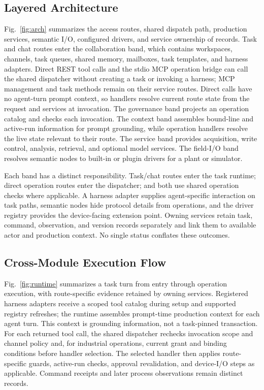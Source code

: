 \subsection{Layered Architecture}
\label{sec:layers}
\label{sec:arch}
Fig.~\ref{fig:arch} summarizes the access routes, shared dispatch path,
production services, semantic I/O, configured drivers, and service ownership
of records. Task and chat routes enter the
collaboration band, which contains workspaces, channels, task queues, shared
memory, mailboxes, task templates, and harness adapters. Direct REST tool
calls and the stdio MCP operation bridge can call the shared dispatcher
without creating a task or invoking a harness; MCP management and task methods
remain on their service routes. Direct calls have no agent-turn prompt
context, so handlers resolve current route state from the request and services
at invocation. The governance band projects an operation catalog and
checks each invocation. The context band assembles bound-line and active-run
information for prompt grounding, while operation handlers resolve the live
state relevant to their route. The service band provides acquisition, write
control, analysis, retrieval, and optional model services. The field-I/O band
resolves semantic nodes to built-in or plugin drivers for a plant or
simulator.

Each band has a distinct responsibility. Task/chat routes enter the task
runtime; direct operation routes enter the dispatcher; and both use shared
operation checks where applicable. A harness adapter supplies
agent-specific interaction on task paths, semantic nodes hide protocol
details from operations, and the driver registry provides the device-facing
extension point. Owning services retain task, command, observation, and
version records separately and link them to available actor and production
context. No single status conflates these outcomes.

\subsection{Cross-Module Execution Flow}
\label{sec:executionflow}
Fig.~\ref{fig:runtime} summarizes a task turn from entry through operation
execution, with route-specific evidence retained by owning services. Registered
harness adapters receive a scoped tool catalog during setup and supported
registry refreshes; the runtime assembles prompt-time production context for
each agent turn. This context is grounding information, not a task-pinned
transaction. For each returned tool call, the shared dispatcher rechecks
invocation scope and channel policy and, for industrial operations, current
grant and binding conditions before handler selection. The selected handler
then applies route-specific guards, active-run checks, approval
revalidation, and device-I/O steps as applicable. Command receipts and later
process observations remain distinct records.

